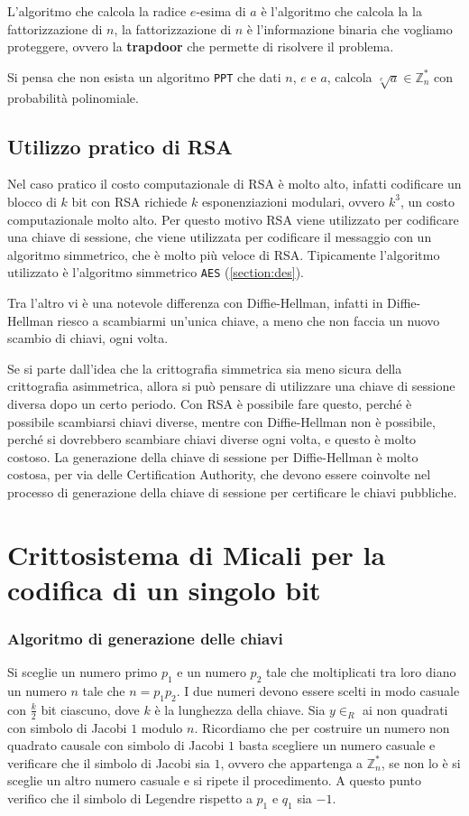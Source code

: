 L'algoritmo che calcola la radice $e$-esima di $a$ è l'algoritmo che calcola la
la fattorizzazione di $n$, la fattorizzazione di $n$ è l'informazione 
binaria che vogliamo proteggere, ovvero la \textbf{trapdoor} che permette di risolvere 
il problema.
\begin{tcolorbox}[title=Fattorizzazione di $n$]
  Si pensa che non esista un algoritmo \texttt{PPT} che dati $n$, $e$ e $a$,
  calcola $\sqrt[e]{a} \in \mathbb{Z}_n^*$ con probabilità polinomiale.
\end{tcolorbox}
\subsection{Utilizzo pratico di RSA}
Nel caso pratico il costo computazionale di RSA è molto alto, infatti codificare 
un blocco di $k$ bit con RSA richiede $k$ esponenziazioni modulari, ovvero $k^3$, 
un costo computazionale molto alto. Per questo motivo RSA viene utilizzato per
codificare una chiave di sessione, che viene utilizzata per codificare
il messaggio con un algoritmo simmetrico, che è molto più veloce di RSA.
Tipicamente l'algoritmo utilizzato è l'algoritmo simmetrico \texttt{AES} (\ref{section:des}).

Tra l'altro vi è una notevole differenza con Diffie-Hellman, infatti in Diffie-Hellman
riesco a scambiarmi un'unica chiave, a meno che non faccia un nuovo scambio di chiavi,
ogni volta.

Se si parte dall'idea che la crittografia simmetrica sia meno sicura della crittografia
asimmetrica, allora si può pensare di utilizzare una chiave di sessione diversa dopo 
un certo periodo. Con RSA è possibile fare questo, perché è possibile scambiarsi
chiavi diverse, mentre con Diffie-Hellman non è possibile, perché si dovrebbero scambiare
chiavi diverse ogni volta, e questo è molto costoso. La generazione della chiave di sessione 
per Diffie-Hellman è molto costosa, per via delle Certification Authority, che devono
essere coinvolte nel processo di generazione della chiave di sessione per certificare 
le chiavi pubbliche.

\section{Crittosistema di Micali per la codifica di un singolo bit}
\subsubsection{Algoritmo di generazione delle chiavi}
Si sceglie un numero primo $p_1$ e un numero $p_2$ tale che moltiplicati tra loro
diano un numero $n$ tale che $n = p_1p_2$. I due numeri devono essere scelti in modo
casuale con $\frac{k}{2}$ bit ciascuno, dove $k$ è la lunghezza della chiave. Sia 
$y \in_R$ ai non quadrati con simbolo di Jacobi $1$ modulo $n$. Ricordiamo che per 
costruire un numero non quadrato causale con simbolo di Jacobi $1$ basta scegliere un numero
casuale e verificare che il simbolo di Jacobi sia $1$, ovvero che appartenga 
a $\mathbb{Z}_n^*$, se non lo è si sceglie un altro
numero casuale e si ripete il procedimento. A questo punto verifico che il simbolo 
di Legendre rispetto a $p_1$ e $q_1$ sia $-1$. 

